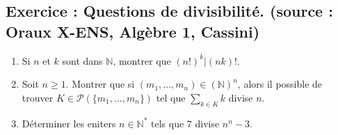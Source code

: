 \documentclass[17pt]{article}
\def\N{\mathbb N}
\begin{document}
	\subsection*{Exercice : Questions de divisibilité. (source : Oraux X-ENS, Algèbre 1, Cassini)}
	\begin{enumerate}
		\item Si $n$ et $k$ sont dans $\N$, montrer que $(n!)^k|(nk)!$.
		\item Soit $n\geq 1$. Montrer que si $(m_1,\dots,m_n)\in(\N)^n$, alors il possible de trouver $K\in\mathcal P(\lbrace m_1,\dots,m_n\rbrace)$ tel que $\sum_{k\in K}k$ divise $n$.
		\item Déterminer les eniters $n\in\N^*$ tels que $7$ divise $n^n-3$.
	\end{enumerate}
\end{document}
